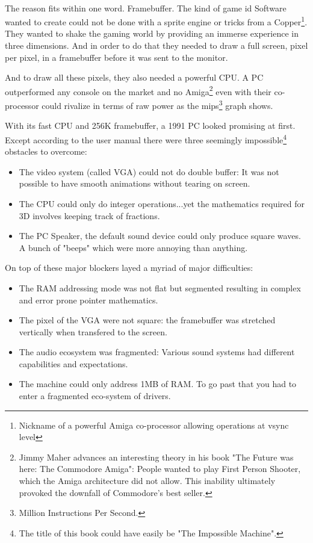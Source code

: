 \\
The reason fits within one word. Framebuffer. The kind of game id Software wanted to create could not be done with a sprite engine or tricks from a Copper\footnote{Nickname of a powerful Amiga co-processor allowing operations at vsync level}. They wanted to shake the gaming world by providing an immerse experience in three dimensions. And in order to do that they needed to draw a full screen, pixel per pixel, in a framebuffer before it was sent to the monitor. \\
\par
And to draw all these pixels, they also needed a powerful CPU. A PC outperformed any console on the market and no Amiga\footnote{Jimmy Maher advances an interesting theory in his book "The Future was here: The Commodore Amiga": People wanted to play First Person Shooter, which the Amiga architecture did not allow. This inability ultimately provoked the downfall of Commodore's best seller.} even with their co-processor could rivalize in terms of raw power as the mips\footnote{Million Instructions Per Second.} graph shows.
\par


 
With its fast CPU and 256K framebuffer, a 1991 PC looked promising at first. Except according to the user manual there were three seemingly impossible\footnote{The title of this book could have easily be "The Impossible Machine".} obstacles to overcome:\\
\begin{itemize}
\item The video system (called VGA) could not do double buffer: It was not possible to have smooth animations without tearing on screen.
\item The CPU could only do integer operations...yet the mathematics required for 3D involves keeping track of fractions.
\item The PC Speaker, the default sound device could only produce square waves. A bunch of "beeps" which were more annoying than anything.
\end{itemize}
On top of these major blockers layed a myriad of major difficulties:\\
\begin{itemize}
\item The RAM addressing mode was not flat but segmented resulting in complex and error prone pointer mathematics.
\item The pixel of the VGA were not square: the framebuffer was stretched vertically when
transfered to the screen.
\item The audio ecosystem was fragmented: Various sound systems had different capabilities and expectations.
\item The machine could only address 1MB of RAM. To go past that you had to enter a fragmented eco-system of drivers.
\end{itemize}


